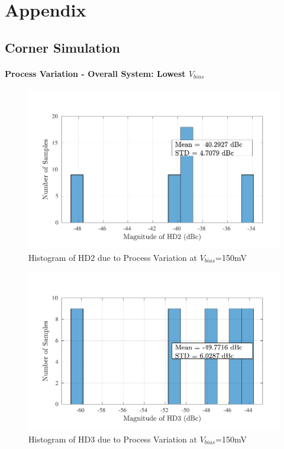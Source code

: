 \chapter{Appendix}

\section{Corner Simulation}

\subsubsection{Process Variation - Overall System: Lowest $V_{bias}$}
\begin{figure} [H]
\centering
\includegraphics[scale=1]{Figures/Corners/Overall/Proc_Min/PDFs/Proc_Min_hd2.pdf}
\caption{Histogram of HD2 due to Process Variation at $V_{bias}$=150mV}
\end{figure}

\begin{figure} [H]
\centering
\includegraphics[scale=1]{Figures/Corners/Overall/Proc_Min/PDFs/Proc_Min_hd3.pdf}
\caption{Histogram of HD3 due to Process Variation at $V_{bias}$=150mV}
\end{figure}

